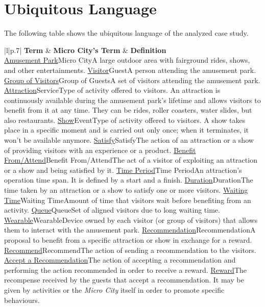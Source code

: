 \section{Ubiquitous Language}
\label{sec:ubiquitous-language}

The following table shows the ubiquitous language of the analyzed case study.

\begin{table}[H]
    \centering
    \begin{tabular}{|l|p{}|}
        \hline
        \textbf{Term} & \textbf{Micro City's Term} & \textbf{Definition}\\
        \hline
        \ul{Amusement Park}{Micro City}{A large outdoor area with fairground rides, shows, and other entertainments.}
        \ul{Visitor}{Guest}{A person attending the amusement park.}
        \ul{Group of Visitors}{Group of Guests}{A set of visitors attending the amusement park.}
        \ul{Attraction}{Service}{Type of activity offered to visitors. An attraction is continuously available during the amusement park's lifetime and allows visitors to benefit from it at any time. They can be rides, roller coasters, water slides, but also restaurants.}
        \ul{Show}{Event}{Type of activity offered to visitors. A show takes place in a specific moment and is carried out only once; when it terminates, it won't be available anymore.}
        \ul{Satisfy}{Satisfy}{The action of an attraction or a show of providing visitors with an experience or a product.}
        \ul{Benefit From/Attend}{Benefit From/Attend}{The act of a visitor of exploiting an attraction or a show and being satisfied by it.}
        \ul{Time Period}{Time Period}{An attraction's operation time span. It is defined by a start and a finish.}
        \ul{Duration}{Duration}{The time taken by an attraction or a show to satisfy one or more visitors.}
        \ul{Waiting Time}{Waiting Time}{Amount of time that visitors wait before benefiting from an activity.}
        \ul{Queue}{Queue}{Set of aligned visitors due to long waiting time.}
        \ul{Wearable}{Wearable}{Device owned by each visitor (or group of visitors) that allows them to interact with the amusement park.}
        \ul{Recommendation}{Recommendation}{A proposal to benefit from a specific attraction or show in exchange for a reward.}
        \ul{Recommend}{Recommend}{The action of sending a recommendation to the visitors.}
        \ul{Accept a Recommendation}{The action of accepting a recommendation and performing the action recommended in order to receive a reward.}
        \ul{Reward}{The recompense received by the guests that accept a recommendation. It may be given by activities or the \textit{Micro City} itself in order to promote specific behaviours.}
    \end{tabular}
    \caption{Ubiquitous language of the amusement park's case study.}
    \label{tab:ul}
\end{table}
